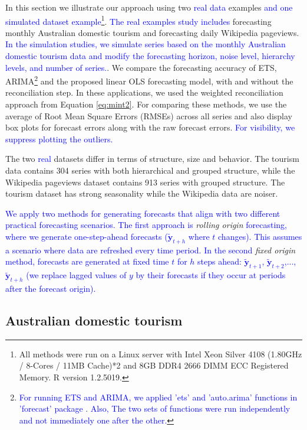 \documentclass[11pt,a4paper,]{article}
\begin{document}
In this section we illustrate our approach using two \textcolor{blue}{real data} examples \textcolor{blue}{and one simulated dataset example}\footnote{All methods were run on a Linux server with Intel Xeon Silver 4108 (1.80GHz / 8-Cores / 11MB Cache)*2 and 8GB DDR4 2666 DIMM ECC Registered Memory. R version 1.2.5019.}. \textcolor{blue}{The real examples study includes }forecasting monthly Australian domestic tourism and forecasting daily Wikipedia pageviews. \textcolor{blue}{In the simulation studies, we simulate series based on the monthly Australian domestic tourism data and modify the forecasting horizon, noise level, hierarchy levels, and number of series.}. We compare the forecasting accuracy of ETS, ARIMA\footnote{\textcolor{blue}{For running ETS and ARIMA, we applied 'ets' and 'auto.arima' functions in 'forecast' package} \autocite{hyndman2020package}. \textcolor{blue}{Also, The two sets of functions were run independently and not immediately one after the other.}} and the proposed linear OLS forecasting model, with and without the reconciliation step. In these applications, we used the weighted reconciliation approach from Equation \eqref{eq:mint2}. For comparing these methods, we use the average of Root Mean Square Errors (RMSEs) across all series and also display box plots for forecast errors along with the raw forecast errors. \textcolor{blue}{For visibility, we suppress plotting the outliers.}

The two \textcolor{blue}{real} datasets differ in terms of structure, size and behavior. The tourism data contains 304 series with both hierarchical and grouped structure, while the Wikipedia pageviews dataset contains 913 series with grouped structure. The tourism dataset has strong seasonality while the Wikipedia data are noiser.

\textcolor{blue}{We apply two methods for generating forecasts that align with two different practical forecasting scenarios. The first approach is} \emph{rolling origin} \textcolor{blue}{forecasting, where we generate one-step-ahead forecasts ($\tilde{\bm{y}}_{t+h}$ where $t$ changes). This assumes a scenario where data are refreshed every time period. In the second} \emph{fixed origin} \textcolor{blue}{method, forecasts are generated at fixed time $t$ for $h$ steps ahead:  $\tilde{\bm{y}}_{t+1}$, $\tilde{\bm{y}}_{t+2}$,...,
$\tilde{\bm{y}}_{t+h}$ (we replace lagged values of $y$ by their forecasts if they occur at periods after the forecast origin).}

\hypertarget{australian-domestic-tourism}{%
\subsection{Australian domestic tourism}\label{australian-domestic-tourism}}
\end{document}
